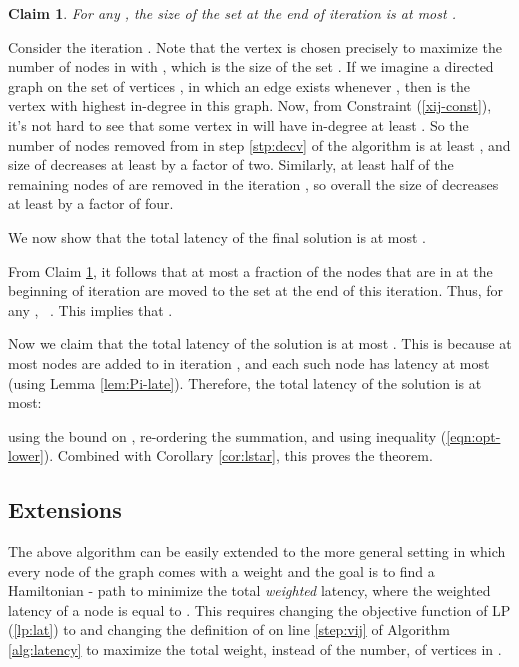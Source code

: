 \documentclass[11pt]{article}
\newcommand{\qed}{\hspace*{\fill}}
\newtheorem{claim}[theorem]{Claim}
\newenvironment{proof}[1][Proof. ]{\noindent {\bf #1 }}{\qed}
\newenvironment{proofof}[1]{\medskip \noindent {\bf{Proof of #1. }}}{\qed}
\begin{document}
\begin{claim} \label{cl:cov}
For any , the size of the set  at the end of iteration  is at most .
\end{claim}
\begin{proof}
Consider the iteration .  Note that the vertex  is chosen precisely to maximize the number of nodes  in  with , which is the size of the set . If we imagine a directed graph  on the set of vertices , in which an edge  exists whenever , then  is the vertex with highest in-degree in this graph. Now, from  Constraint (\ref{xij-const}), it's not hard to see that some vertex in  will have in-degree at least . So the number of nodes removed from  in step \ref{stp:decv} of the algorithm is at least , and size of  decreases at least by a factor of two. Similarly, at least half of the remaining nodes of  are removed in the iteration , so overall the size of  decreases at least by a factor of four.
\end{proof}

\medskip




We now show that the total latency of the final solution  
is at most .



\begin{proofof}{Theorem \ref{thm:lat}}
From Claim \ref{cl:cov}, it follows that at most
a  fraction of the  nodes that are in  at the beginning of iteration  are moved to the set  at the end of this iteration. Thus, for any ,~ . This implies that .

Now we claim that the total latency of the solution  is at most
.
This is because at most  nodes are added to  in iteration , and each such node has latency
at most  (using Lemma \ref{lem:Pi-late}). 
Therefore, the total latency of the solution is at most:

using the bound on , re-ordering the summation, and using inequality (\ref{eqn:opt-lower}). Combined with Corollary \ref{cor:lstar}, this proves the theorem.
\end{proofof}








\subsection{Extensions}
The above algorithm can be easily extended to the more general setting in which every node of the graph comes with a weight  and the goal is to find a Hamiltonian - path to minimize the total {\em weighted} latency, where the weighted latency of a node  is equal to 
. 
This requires changing the objective function of LP (\ref{lp:lat}) to  and changing the definition of  on line \ref{step:vij} of Algorithm \ref{alg:latency} to maximize the total weight, instead of the number, of vertices in .
\end{document}
